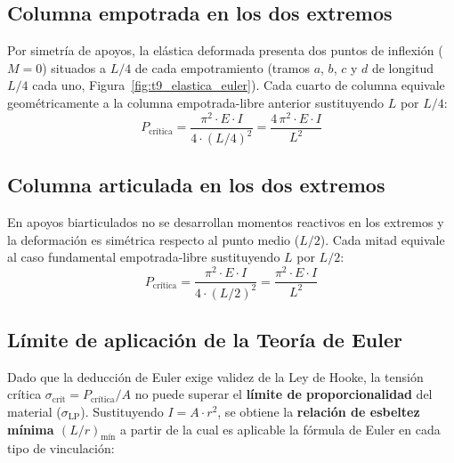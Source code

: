 \subsection{Columna empotrada en los dos extremos}
Por simetría de apoyos, la elástica deformada presenta dos puntos de inflexión ($M=0$) situados a $L/4$ de cada empotramiento (tramos $a$, $b$, $c$ y $d$ de longitud $L/4$ cada uno, Figura~\ref{fig:t9_elastica_euler}). Cada cuarto de columna equivale geométricamente a la columna empotrada-libre anterior sustituyendo $L$ por $L/4$:
\begin{equation}
    P_{\text{crítica}} = \frac{\pi^2 \cdot E \cdot I}{4 \cdot (L/4)^2} = \frac{4\,\pi^2 \cdot E \cdot I}{L^2}
    \label{eq:t9_Pcrit_biempotrada}
\end{equation}

\subsection{Columna articulada en los dos extremos}
En apoyos biarticulados no se desarrollan momentos reactivos en los extremos y la deformación es simétrica respecto al punto medio ($L/2$). Cada mitad equivale al caso fundamental empotrada-libre sustituyendo $L$ por $L/2$:
\begin{equation}
    P_{\text{crítica}} = \frac{\pi^2 \cdot E \cdot I}{4 \cdot (L/2)^2} = \frac{\pi^2 \cdot E \cdot I}{L^2}
    \label{eq:t9_Pcrit_biarticulada}
\end{equation}

\subsection{Límite de aplicación de la Teoría de Euler}
Dado que la deducción de Euler exige validez de la Ley de Hooke, la tensión crítica $\sigma_{\text{crít}} = P_{\text{crítica}}/A$ no puede superar el \textbf{límite de proporcionalidad} del material ($\sigma_{\text{LP}}$). Sustituyendo $I = A\cdot r^2$, se obtiene la \textbf{relación de esbeltez mínima $(L/r)_{\text{mín}}$} a partir de la cual es aplicable la fórmula de Euler en cada tipo de vinculación:

